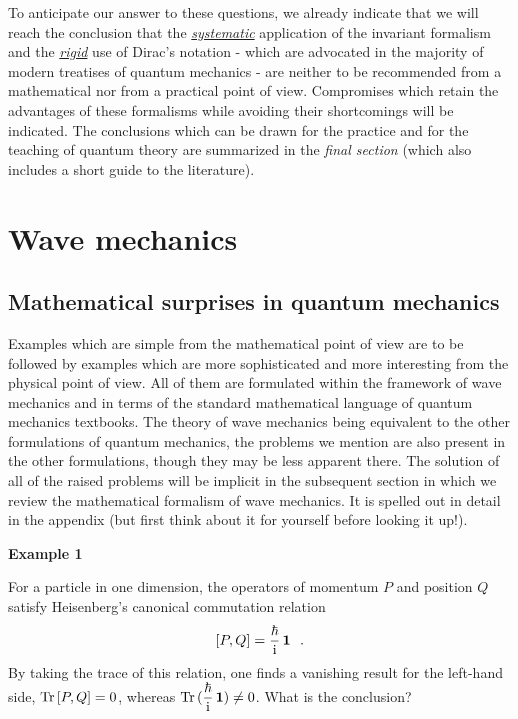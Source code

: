 \documentclass[a4wide,12pt]{report}
\begin{document}
To anticipate our answer to these questions, we already indicate
that we
will reach the conclusion that the 
{\underline{\em systematic}} application
of the invariant formalism and the {\underline{\em rigid}} 
use of Dirac's
notation - which are advocated in the majority of modern treatises
of quantum mechanics -
are neither to be recommended from a mathematical nor
from a practical point of view.
Compromises which retain the advantages of these
formalisms while avoiding their shortcomings will be
indicated. The conclusions which can be drawn for the 
practice and for the teaching of quantum theory 
are summarized in the {\em final section} 
(which also includes a short guide to the literature). 



\chapter{Wave mechanics}

\section{Mathematical surprises in quantum mechanics}


Examples which are simple from the mathematical point of view
are to be followed by examples which are more sophisticated 
and more interesting from the physical point of view.
 All of them are formulated within the framework
of wave mechanics and in terms of the standard mathematical language of quantum
mechanics textbooks.
The theory of wave mechanics being equivalent to the
other formulations of quantum mechanics, the 
problems we mention 
are also present in the other formulations,
though they may be less apparent there.
The solution of all of the raised problems will be implicit
in the subsequent  
section in which we review the mathematical formalism 
of wave mechanics. It is spelled out in detail
in the appendix
(but first think about it for yourself before looking 
it up!). 
 
 
 
 
\bigskip
 
\noindent 
{\bf Example 1}
 
\medskip
 
For a particle in one dimension, the operators of
momentum $P$ and position $Q$ satisfy Heisenberg's canonical
commutation relation
\begin{equation}
\label{hei} 
[ P, Q ] = \displaystyle{\hbar \over {\rm i}} \, {\bf 1}
\ \ .
\end{equation}
By taking the trace of this relation, one finds a vanishing
result for the left-hand side,
${\rm Tr} \, [P,Q]=0$, whereas
${\rm Tr} \,
( \displaystyle{\hbar \over {\rm i}} \, {\bf 1} ) \neq 0$. What is the conclusion?
 
\end{document}
